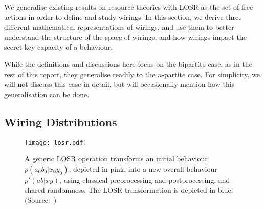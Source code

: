 \documentclass[10pt, a4paper]{article}
\numberwithin{equation}{section} %
\theoremstyle{definition}
\theoremstyle{plain}
\newcommand{\?}{\mathrel{?}} %
\begin{document}
              We generalise existing results on resource theories with LOSR as the set of free actions in order to define and study wirings. In this section, we derive three different mathematical representations of wirings, and use them to better understand the structure of the space of wirings, and how wirings impact the secret key capacity of a behaviour.

                While the definitions and discussions here focus on the bipartite case, as in the rest of this report, they generalise readily to the \(n\)-partite case. For simplicity, we will not discuss this case in detail, but will occasionally mention how this generalisation can be done.

              \subsection{Wiring Distributions}\label{sec:locwir_dist}

              \begin{figure}
                \centering
                \texttt{[image: losr.pdf]}
                \caption[Depiction of a generic LOSR operation.]{\label{fig:losr} A generic LOSR operation transforms an initial behaviour \(p(a_0 b_0|x_0 y_0)\), depicted in pink, into a new overall behaviour \(p'(ab|xy)\), using classical preprocessing and postprocessing, and shared randomness. The LOSR transformation is depicted in blue. (Source:~\cite{BellResourceTheory})}
              \end{figure}
\end{document}
